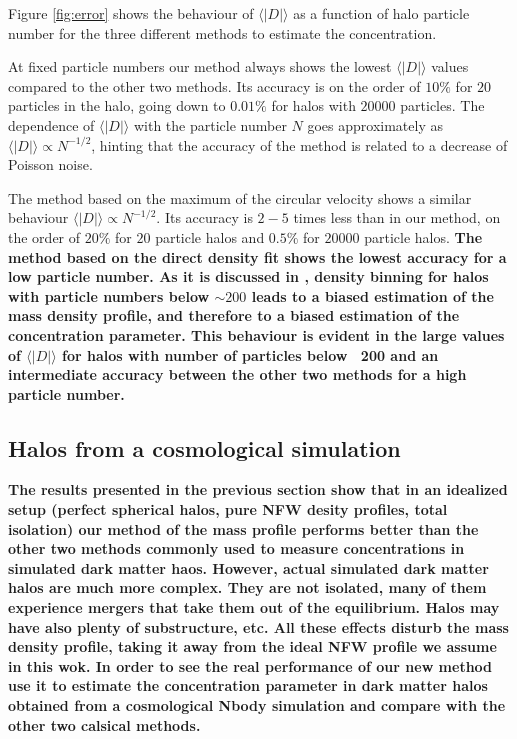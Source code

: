 \documentclass[a4,useAMS,usenatbib,usegraphicx]{mn2e}
\newcommand{\avg}[1]{\langle{#1}\rangle}
\begin{document}
Figure \ref{fig:error} shows the behaviour of $\avg{|D|}$ as a function of
halo particle number for the three different methods to estimate the
concentration.

At fixed particle numbers our method always shows the lowest
$\avg{|D|}$ values compared to the other two methods.  Its accuracy is
on the order of $10\%$ for $20$ particles in the halo, going down to
$0.01\%$ for halos with $20000$ particles.  The dependence of
$\avg{|D|}$ with the particle number $N$ goes approximately as
$\avg{|D|}\propto N^{-1/2}$, hinting that the accuracy of the method
is related to a decrease of Poisson noise.

The method based on the maximum of the circular velocity shows a
similar behaviour $\avg{|D|}\propto N^{-1/2}$.  Its accuracy is $2-5$
times less than in our method, on the order of $20\%$ for $20$
particle halos and $0.5\%$ for $20000$ particle halos. {\bf The method
  based on the direct density fit shows the lowest accuracy for a low
  particle number. As it is discussed in \citep{Munoz2011}, density
  binning for halos with particle numbers below $\sim200$ leads to a
  biased estimation of the mass density profile, and therefore to a
  biased estimation of the concentration parameter. This behaviour is
  evident in the large values of $\avg{|D|}$ for halos with number of
  particles below ~200 and an intermediate accuracy between the other
  two methods for a high particle number.}

\subsection{Halos from a cosmological simulation}




{\bf The results presented in the previous section show that in an
  idealized setup (perfect spherical halos, pure NFW desity profiles,
  total isolation) our method of the mass profile performs better than
  the other two methods commonly used to measure concentrations in
  simulated dark matter haos. However, actual simulated dark matter
  halos are much more complex. They are not isolated, many of them
  experience mergers that take them out of the equilibrium. Halos may
  have also plenty of substructure, etc. All these effects disturb the
  mass density profile, taking it away from the ideal NFW profile we
  assume in this wok. In order to see the real performance of our new
  method use it to estimate the concentration parameter in dark matter
  halos obtained from a cosmological Nbody simulation and compare with
  the other two calsical methods.}
\end{document}
